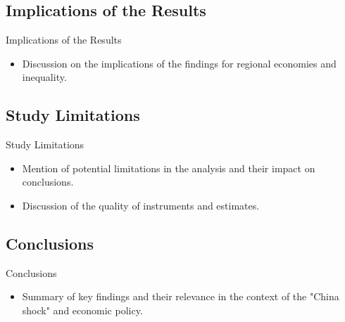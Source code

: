 \subsection{Implications of the Results}
\begin{frame}{Implications of the Results}
    \begin{itemize}
        \item Discussion on the implications of the findings for regional economies and inequality.
    \end{itemize}
\end{frame}

\subsection{Study Limitations}
\begin{frame}{Study Limitations}
    \begin{itemize}
        \item Mention of potential limitations in the analysis and their impact on conclusions.
        \item Discussion of the quality of instruments and estimates.
    \end{itemize}
\end{frame}

\subsection{Conclusions}
\begin{frame}{Conclusions}
    \begin{itemize}
        \item Summary of key findings and their relevance in the context of the "China shock" and economic policy.
    \end{itemize}
\end{frame}